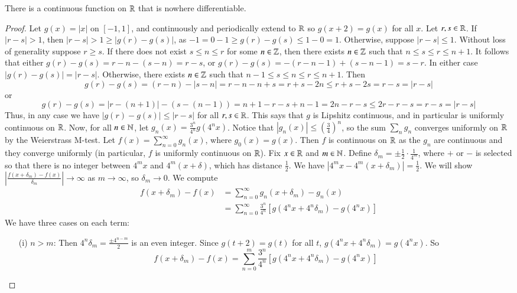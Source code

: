 \begin{thm}
    There is a continuous function on $\mathbb R$ that is nowhere differentiable.
\end{thm}
\begin{proof}
    Let $g(x) = |x|$ on $[-1,1]$, and continuously and periodically extend to $\mathbb R$ so $g(x+2) =g(x)$ for all $x$. Let $r,s \in \mathbb R$. If $|r-s| > 1$, then $|r-s| > 1 \geq |g(r) - g(s)|$, as $-1 = 0-1\geq g(r)-g(s) \leq 1 - 0 = 1$. Otherwise, suppose $|r-s| \leq 1$. Without loss of generality suppose $r \geq s$. If there does not exist $s \leq n \leq r$ for some $n \in \mathbb Z$, then there exists $n \in \mathbb Z$ such that $n \leq s \leq r \leq n+1$. It follows that either $g(r) - g(s) = r-n-(s-n) = r-s$, or $g(r) - g(s) = -(r-n-1)+(s-n-1) = s-r$. In either case $|g(r) - g(s)| = |r-s|$. Otherwise, there exists $n \in \mathbb Z$ such that $n-1 \leq s \leq n \leq r \leq n+1$. Then $$g(r) - g(s) = (r-n)-|s-n| = r-n-n+s=r+s-2n\leq r+s-2s = r-s = |r-s|$$ or $$g(r)-g(s) = |r-(n+1)| -(s-(n-1)) = n+1-r-s+n-1 = 2n-r-s \leq 2r-r-s = r-s = |r-s|$$ Thus, in any case we have $|g(r) - g(s)| \leq |r-s|$ for all $r,s \in \mathbb R$. This says that $g$ is Lipshitz continuous, and in particular is uniformly continuous on $\mathbb R$. Now, for all $n \in \mathbb N$, let $g_n(x) = \frac{3^n}{4^n}g(4^nx)$. Notice that $|g_n(x)| \leq \left(\frac{3}{4}\right)^n$, so the sum $\sum_n g_n$ converges uniformly on $\mathbb R$ by the Weierstrass M-test. Let $f(x) = \sum_{n=0}^{\infty}g_n(x)$, where $g_0(x) = g(x)$. Then $f$ is continuous on $\mathbb R$ as the $g_n$ are continuous and they converge uniformly (in particular, $f$ is uniformly continuous on $\mathbb R$). Fix $x \in \mathbb R$ and $m \in \mathbb N$. Define $\delta_m = \pm\frac{1}{2}\cdot\frac{1}{4^m}$, where $+$ or $-$ is selected so that there is no integer between $4^mx$ and $4^m(x+\delta)$, which has distance $\frac{1}{2}$. We have $|4^mx - 4^m(x+\delta_m)| = \frac{1}{2}$. We will show $\left|\frac{f(x+\delta_m) - f(x)}{\delta_m}\right|\rightarrow \infty$ as $m\rightarrow \infty$, so $\delta_m\rightarrow 0$. We compute \begin{align*}
        f(x+\delta_m) - f(x) &= \sum_{n=0}^{\infty}g_n(x+\delta_m) - g_n(x) \\
        &= \sum_{n=0}^{\infty}\frac{3^n}{4^n}\left[g(4^nx+4^n\delta_m) - g(4^nx)\right] 
    \end{align*}
    We have three cases on each term: \begin{itemize}
        \item[(i)] $n > m$: Then $4^n\delta_m = \frac{\pm 4^{n-m}}{2}$ is an even integer. Since $g(t+2)=g(t)$ for all $t$, $g(4^nx+4^n\delta_m) = g(4^nx)$. So $$f(x+\delta_m) - f(x) = \sum_{n=0}^m\frac{3^n}{4^n}[g(4^nx+4^n\delta_m) - g(4^nx)]$$

\end{itemize}
\end{proof}
